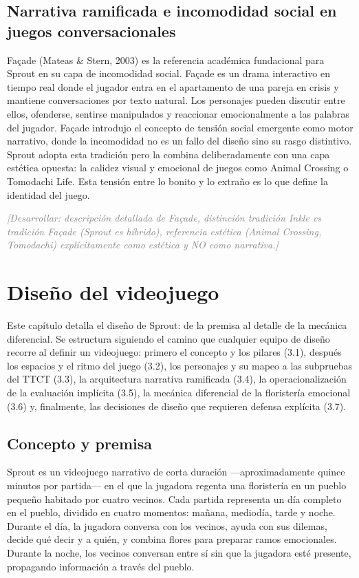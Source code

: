 \documentclass[12pt,twoside,titlepage]{report}
\begin{document}
\section{Narrativa ramificada e incomodidad social en juegos conversacionales}

Façade (Mateas \& Stern, 2003) es la referencia académica fundacional para Sprout en su capa de incomodidad social. Façade es un drama interactivo en tiempo real donde el jugador entra en el apartamento de una pareja en crisis y mantiene conversaciones por texto natural. Los personajes pueden discutir entre ellos, ofenderse, sentirse manipulados y reaccionar emocionalmente a las palabras del jugador. Façade introdujo el concepto de tensión social emergente como motor narrativo, donde la incomodidad no es un fallo del diseño sino su rasgo distintivo. Sprout adopta esta tradición pero la combina deliberadamente con una capa estética opuesta: la calidez visual y emocional de juegos como Animal Crossing o Tomodachi Life. Esta tensión entre lo bonito y lo extraño es lo que define la identidad del juego.

\textcolor{gray}{\textit{[Desarrollar: descripción detallada de Façade, distinción tradición Inkle vs tradición Façade (Sprout es híbrido), referencia estética (Animal Crossing, Tomodachi) explícitamente como estética y NO como narrativa.]}}

\chapter{Diseño del videojuego}

Este capítulo detalla el diseño de Sprout: de la premisa al detalle de la mecánica diferencial. Se estructura siguiendo el camino que cualquier equipo de diseño recorre al definir un videojuego: primero el concepto y los pilares (3.1), después los espacios y el ritmo del juego (3.2), los personajes y su mapeo a las subpruebas del TTCT (3.3), la arquitectura narrativa ramificada (3.4), la operacionalización de la evaluación implícita (3.5), la mecánica diferencial de la floristería emocional (3.6) y, finalmente, las decisiones de diseño que requieren defensa explícita (3.7).

\section{Concepto y premisa}

Sprout es un videojuego narrativo de corta duración ---aproximadamente quince minutos por partida--- en el que la jugadora regenta una floristería en un pueblo pequeño habitado por cuatro vecinos. Cada partida representa un día completo en el pueblo, dividido en cuatro momentos: mañana, mediodía, tarde y noche. Durante el día, la jugadora conversa con los vecinos, ayuda con sus dilemas, decide qué decir y a quién, y combina flores para preparar ramos emocionales. Durante la noche, los vecinos conversan entre sí sin que la jugadora esté presente, propagando información a través del pueblo.
\end{document}
